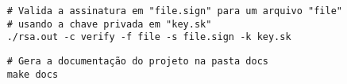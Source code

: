\documentclass{article}
\newenvironment{code}{\captionsetup{type=listing}}{}
\begin{document}
\begin{code}
\begin{verbatim}
	# Valida a assinatura em "file.sign" para um arquivo "file" 
	# usando a chave privada em "key.sk"
	./rsa.out -c verify -f file -s file.sign -k key.sk
\end{verbatim}
\label{lst:signature_validate}
\end{code}

\begin{code}
\begin{verbatim}
	# Gera a documentação do projeto na pasta docs
	make docs
\end{verbatim}
\label{lst:docs}
\end{code}
\end{document}
